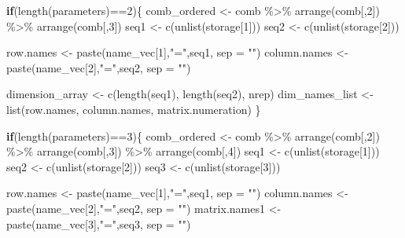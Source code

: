 \documentclass[11pt,a4paper]{article}
\newenvironment{Shaded}{\begin{snugshade}}{\end{snugshade}}
\newcommand{\AttributeTok}[1]{\textcolor[rgb]{0.77,0.63,0.00}{#1}}
\newcommand{\ControlFlowTok}[1]{\textcolor[rgb]{0.13,0.29,0.53}{\textbf{#1}}}
\newcommand{\DecValTok}[1]{\textcolor[rgb]{0.00,0.00,0.81}{#1}}
\newcommand{\FunctionTok}[1]{\textcolor[rgb]{0.00,0.00,0.00}{#1}}
\newcommand{\NormalTok}[1]{#1}
\newcommand{\OtherTok}[1]{\textcolor[rgb]{0.56,0.35,0.01}{#1}}
\newcommand{\SpecialCharTok}[1]{\textcolor[rgb]{0.00,0.00,0.00}{#1}}
\newcommand{\StringTok}[1]{\textcolor[rgb]{0.31,0.60,0.02}{#1}}
\begin{document}
\begin{Shaded}
\begin{Highlighting}[]
  \ControlFlowTok{if}\NormalTok{(}\FunctionTok{length}\NormalTok{(parameters)}\SpecialCharTok{==}\DecValTok{2}\NormalTok{)\{}
\NormalTok{    comb\_ordered }\OtherTok{\textless{}{-}}\NormalTok{  comb }\SpecialCharTok{\%\textgreater{}\%} \FunctionTok{arrange}\NormalTok{(comb[,}\DecValTok{2}\NormalTok{])  }\SpecialCharTok{\%\textgreater{}\%} \FunctionTok{arrange}\NormalTok{(comb[,}\DecValTok{3}\NormalTok{])}
\NormalTok{    seq1 }\OtherTok{\textless{}{-}} \FunctionTok{c}\NormalTok{(}\FunctionTok{unlist}\NormalTok{(storage[}\DecValTok{1}\NormalTok{]))}
\NormalTok{    seq2 }\OtherTok{\textless{}{-}} \FunctionTok{c}\NormalTok{(}\FunctionTok{unlist}\NormalTok{(storage[}\DecValTok{2}\NormalTok{]))}
    
\NormalTok{    row.names }\OtherTok{\textless{}{-}} \FunctionTok{paste}\NormalTok{(name\_vec[}\DecValTok{1}\NormalTok{],}\StringTok{"="}\NormalTok{,seq1, }\AttributeTok{sep =} \StringTok{""}\NormalTok{)}
\NormalTok{    column.names }\OtherTok{\textless{}{-}}  \FunctionTok{paste}\NormalTok{(name\_vec[}\DecValTok{2}\NormalTok{],}\StringTok{"="}\NormalTok{,seq2, }\AttributeTok{sep =} \StringTok{""}\NormalTok{)}
    
\NormalTok{    dimension\_array }\OtherTok{\textless{}{-}} \FunctionTok{c}\NormalTok{(}\FunctionTok{length}\NormalTok{(seq1), }\FunctionTok{length}\NormalTok{(seq2), nrep)}
\NormalTok{    dim\_names\_list }\OtherTok{\textless{}{-}} \FunctionTok{list}\NormalTok{(row.names, column.names, matrix.numeration)}
\NormalTok{  \}}
  
  \ControlFlowTok{if}\NormalTok{(}\FunctionTok{length}\NormalTok{(parameters)}\SpecialCharTok{==}\DecValTok{3}\NormalTok{)\{}
\NormalTok{    comb\_ordered }\OtherTok{\textless{}{-}}\NormalTok{  comb }\SpecialCharTok{\%\textgreater{}\%} \FunctionTok{arrange}\NormalTok{(comb[,}\DecValTok{2}\NormalTok{])  }\SpecialCharTok{\%\textgreater{}\%} 
      \FunctionTok{arrange}\NormalTok{(comb[,}\DecValTok{3}\NormalTok{]) }\SpecialCharTok{\%\textgreater{}\%} \FunctionTok{arrange}\NormalTok{(comb[,}\DecValTok{4}\NormalTok{]) }
\NormalTok{    seq1 }\OtherTok{\textless{}{-}} \FunctionTok{c}\NormalTok{(}\FunctionTok{unlist}\NormalTok{(storage[}\DecValTok{1}\NormalTok{]))}
\NormalTok{    seq2 }\OtherTok{\textless{}{-}} \FunctionTok{c}\NormalTok{(}\FunctionTok{unlist}\NormalTok{(storage[}\DecValTok{2}\NormalTok{]))}
\NormalTok{    seq3 }\OtherTok{\textless{}{-}} \FunctionTok{c}\NormalTok{(}\FunctionTok{unlist}\NormalTok{(storage[}\DecValTok{3}\NormalTok{]))}
    
\NormalTok{    row.names }\OtherTok{\textless{}{-}} \FunctionTok{paste}\NormalTok{(name\_vec[}\DecValTok{1}\NormalTok{],}\StringTok{"="}\NormalTok{,seq1, }\AttributeTok{sep =} \StringTok{""}\NormalTok{)}
\NormalTok{    column.names }\OtherTok{\textless{}{-}}  \FunctionTok{paste}\NormalTok{(name\_vec[}\DecValTok{2}\NormalTok{],}\StringTok{"="}\NormalTok{,seq2, }\AttributeTok{sep =} \StringTok{""}\NormalTok{)}
\NormalTok{    matrix.names1 }\OtherTok{\textless{}{-}}  \FunctionTok{paste}\NormalTok{(name\_vec[}\DecValTok{3}\NormalTok{],}\StringTok{"="}\NormalTok{,seq3, }\AttributeTok{sep =} \StringTok{""}\NormalTok{)}
    

\end{Highlighting}
\end{Shaded}
\end{document}
